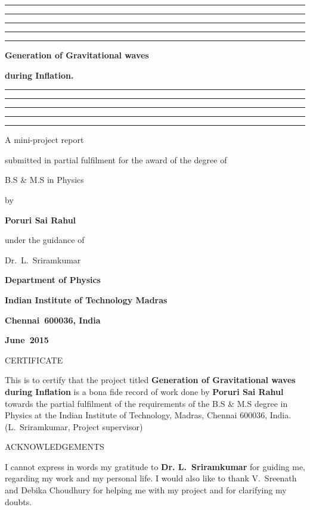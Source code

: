 \documentclass[12pt,a4paper,oneside]{book}
\begin{document}

\baselineskip 20pt




\thispagestyle{empty}
\topskip 15pt
\hrule\hrule\hrule\hrule\hrule
\vskip 20pt
\centerline{\Huge \bf Generation of Gravitational waves} 
\vskip 15pt
\centerline{\Huge \bf during Inflation.} 
\vskip 20pt
\hrule\hrule\hrule\hrule\hrule
\vskip 30pt
\centerline{\Large A mini-project report}
\vskip 8pt
\centerline{\Large submitted in partial fulfilment 
for the award of the degree of}
\vskip 8pt
\centerline{\Large B.S \& M.S in Physics}
\vskip 8pt
\centerline{\Large by}
\vskip 8pt
\centerline{\Large \bf Poruri Sai Rahul}
\vskip 8pt
\centerline{\Large under the guidance of}
\vskip 8pt
\centerline{\Large  Dr.~L.~Sriramkumar}
\vskip 30pt 
\begin{center}
\end{center}
\vskip 8pt 
\centerline{\Large \bf Department of Physics}
\vskip 8pt 
\centerline{\Large \bf Indian Institute of Technology Madras}
\vskip 8pt 
\centerline{\Large \bf Chennai~600036, India}
\vskip 8pt
\centerline{\Large \bf June~2015}

\newpage\topskip 40pt
\centerline{\Large CERTIFICATE}
\thispagestyle{empty}
\vskip 20pt\noindent 
This is to certify that the project titled {\bf Generation of Gravitational
waves during Inflation} is a bona fide record of work done by 
{\bf Poruri Sai Rahul} towards the partial fulfilment of the 
requirements of the B.S \& M.S degree in Physics at the Indian 
Institute of Technology, Madras, Chennai 600036, India.
\vskip 120pt
\hspace{240pt}(L.~Sriramkumar, Project supervisor)


\newpage\topskip 40pt
\thispagestyle{empty}
\centerline{\Large ACKNOWLEDGEMENTS}
\vskip 20pt\noindent 

I cannot express in words my gratitude to {\bf Dr. L.~Sriramkumar} 
for guiding me, regarding my work and my personal life. I would also
like to thank V.~Sreenath and Debika Choudhury for helping me 
with my project and for clarifying my doubts.
\end{document}
